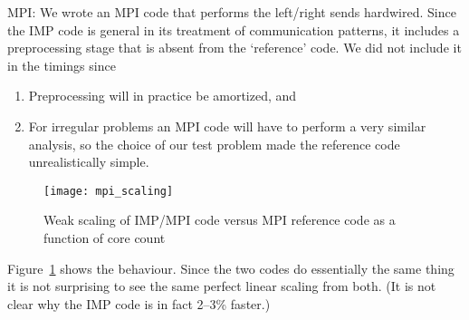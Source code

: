 MPI: We wrote an MPI code that performs the left/right sends
hardwired. Since the IMP code is general in its treatment of 
communication patterns, it includes a preprocessing stage that is absent
from the `reference' code. We did not include it in the timings since
\begin{enumerate}
\item Preprocessing will in practice be amortized, and
\item For irregular problems an MPI code will have to perform a 
  very similar analysis, so the choice of our test problem made the reference
  code unrealistically simple.
\end{enumerate}
\begin{figure}[ht]
  \texttt{[image: mpi\_scaling]}
  \caption{Weak scaling of IMP/MPI code versus MPI reference code
    as a function of core count}
  \label{fig:mpi-scale}
\end{figure}
Figure~\ref{fig:mpi-scale} shows the behaviour.  Since the two codes
do essentially the same thing it is not surprising to see the same
perfect linear scaling from both. (It is not clear why the IMP code is
in fact 2--3\% faster.)

\begin{comment}
  \heading{Discussion of the prototype}

  We address a few possible criticisms of the prototype.
  \begin{description}
  \item[Limitations] This example uses a 1D distribution, but 2D and sparse
    distributions are possible.
  \item[Regarding the originality of distributions] The concept of
    distribution is not new. However, the innovation here lies in the
    fact that distributions are also used as a tool for describing the
    algorithm. Thus, the IMP translator can relate data storage and
    data requirements, and thus come up with an efficient
    implementation.
  \item[Synchronous vs asynchronous] The IMP kernels seem to imply a notion of
    BSP-like supersteps. This is not the case: the kernels translate to a dataflow
    \ac{IR} which can be executed fully asynchronously.
  \item[Function pointer callbacks] The above implementation of the 1D
    example uses callbacks. These would not be necessary in an MPI
    realization, but they \emph{are} necessary for a task-based
    interpretation. For MPI, the system allows you to execute a kernel
    directly.
  \end{description}
\end{comment}

